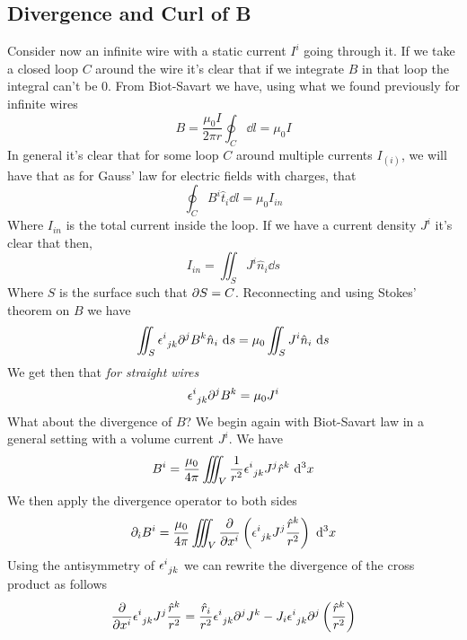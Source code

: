 \documentclass[../electromagnetism]{subfiles}
\begin{document}
\subsection{Divergence and Curl of B}
Consider now an infinite wire with a static current $I^i$ going through it. If we take a closed loop $C$ around the wire it's clear that if we integrate $B$ in that loop the integral can't be 0. From Biot-Savart we have, using what we found previously for infinite wires
\begin{equation}
	B=\frac{\mu_0I}{2\pi r}\oint_C\dd l=\mu_0 I
	\label{eq:biotsavwiresintcurr}
\end{equation}
In general it's clear that for some loop $C$ around multiple currents $I_{(i)}$, we will have that as for Gauss' law for electric fields with charges, that
\begin{equation}
	\oint_CB^i\hat{t}_i\dd l=\mu_0 I_{in}
	\label{eq:totcurrin}
\end{equation}
Where $I_{in}$ is the total current inside the loop. If we have a current density $J^i$ it's clear that then,
\begin{equation*}
	I_{in}=\iint_{S}J^i\hat{n}_i\dd s
\end{equation*}
Where $S$ is the surface such that $\partial S=C$. Reconnecting and using Stokes' theorem on $B$ we have
\begin{equation}
	\iint_S\epsilon^{i}_{\ jk}\partial^jB^k\hat{n}_i\ \mathrm{d} s=\mu_0\iint_SJ^i\hat{n}_i\ \mathrm{d} s
	\label{eq:ampereintwires}
\end{equation}
We get then that \emph{for straight wires}
\begin{equation}
	\epsilon^{i}_{\ jk}\partial^jB^k=\mu_0J^i
	\label{eq:rotbwires}
\end{equation}
What about the divergence of $B$? We begin again with Biot-Savart law in a general setting with a volume current $J^i$. We have
\begin{equation*}
	B^i=\frac{\mu_0}{4\pi}\iiint_V\frac{1}{r^2}\epsilon^{i}_{\ jk}J^j\hat{r}^k\ \mathrm{d}^3x
\end{equation*}
We then apply the divergence operator to both sides
\begin{equation*}
	\partial_iB^i=\frac{\mu_0}{4\pi}\iiint_V\pdv{x^i}\left( \epsilon^{i}_{\ jk}J^j\frac{\hat{r}^k}{r^2} \right)\ \mathrm{d}^3x
\end{equation*}
Using the antisymmetry of $\epsilon^{i}_{\ jk}$ we can rewrite the divergence of the cross product as follows
\begin{equation*}
	\pdv{x^i}\epsilon^{i}_{\ jk}J^j\frac{\hat{r}^k}{r^2}=\frac{\hat{r}_i}{r^2}\epsilon^{i}_{\ jk}\partial^jJ^k-J_i\epsilon^{i}_{\ jk}\partial^j\left( \frac{\hat{r}^k}{r^2} \right)
\end{equation*}
\end{document}

